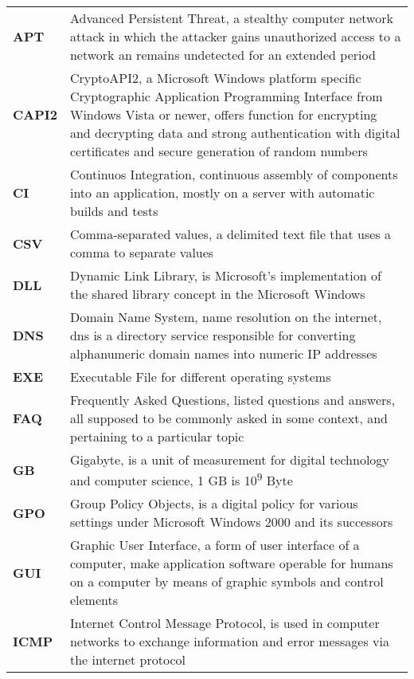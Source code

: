 \setcounter{page}{6}

\def\arraystretch{1.5}
\begin{longtable}{ p{4cm}  p{12cm} } 
    \textbf{APT} & Advanced Persistent Threat, a stealthy computer network attack in which the attacker gains unauthorized access to a network an remains undetected for an extended period \\ 
    \textbf{CAPI2} & CryptoAPI2, a Microsoft Windows platform specific Cryptographic Application Programming Interface from Windows Vista or newer, offers function for encrypting and decrypting data and strong authentication with digital certificates and secure generation of random numbers \\
    \textbf{CI} & Continuos Integration, continuous assembly of components into an application, mostly on a server with automatic builds and tests \\
    \textbf{CSV} & Comma-separated values, a delimited text file that uses a comma to separate values\\
    \textbf{DLL} &	Dynamic Link Library,  is Microsoft's implementation of the shared library concept in the Microsoft Windows\\
    \textbf{DNS} & Domain Name System, name resolution on the internet, dns is a directory service responsible for converting alphanumeric domain names into numeric IP addresses\\
    \textbf{EXE} & Executable File for different operating systems\\
    \textbf{FAQ} & Frequently Asked Questions, listed questions and answers, all supposed to be commonly asked in some context, and pertaining to a particular topic\\
    \textbf{GB} & Gigabyte, is a unit of measurement for digital technology and computer science, 1 GB is 10\textsuperscript{9} Byte\\
    \textbf{GPO} & Group Policy Objects, is a digital policy for various settings under Microsoft Windows 2000 and its successors \\
    \textbf{GUI} &	Graphic User Interface, a form of user interface of a computer, make application software operable for humans on a computer by means of graphic symbols and control elements\\
    \textbf{ICMP} & Internet Control Message Protocol, is used in computer networks to exchange information and error messages via the internet protocol\\

\end{longtable}
